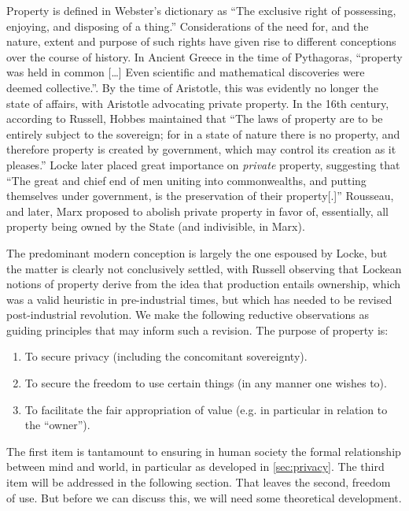 \documentclass[pra,twocolumn,groupedaddress,10pt]{revtex4}
\theoremstyle{definition}
\begin{document}
Property is defined in Webster's dictionary as ``The exclusive right of possessing, enjoying, and disposing of a thing.'' Considerations of the need for, and the nature, extent and purpose of such rights have given rise to different conceptions over the course of history. In Ancient Greece in the time of Pythagoras, ``property was held in common [\ldots] Even scientific and mathematical discoveries were deemed collective.''\cite{russell}. By the time of Aristotle, this was evidently no longer the state of affairs, with Aristotle advocating private property. In the 16th century, according to Russell, Hobbes maintained that ``The laws of property are to be entirely subject to the sovereign; for in a state of nature there is no property, and therefore property is created by government, which may control its creation as it pleases.'' Locke\cite{locke} later placed great importance on \textit{private} property, suggesting that ``The great and chief end of men uniting into commonwealths, and putting themselves under government, is the preservation of their property[.]'' Rousseau, and later, Marx\cite{marx} proposed to abolish private property in favor of, essentially, all property being owned by the State (and indivisible, in Marx).

The predominant modern conception is largely the one espoused by Locke, but the matter is clearly not conclusively settled, with Russell observing that Lockean notions of property derive from the idea that production entails ownership, which was a valid heuristic in pre-industrial times, but which has needed to be revised post-industrial revolution. We make the following reductive observations as guiding principles that may inform such a revision. The purpose of property is:

\begin{enumerate}
	\item To secure privacy (including the concomitant sovereignty).
	\item To secure the freedom to use certain things (in any manner one wishes to). %
	\item To facilitate the fair appropriation of value (e.g. in particular in relation to the ``owner'').
\end{enumerate}

The first item is tantamount to ensuring in human society the formal relationship between mind and world, in particular as developed in \autoref{sec:privacy}. The third item will be addressed in the following section. That leaves the second, freedom of use. But before we can discuss this, we will need some theoretical development.
\end{document}
